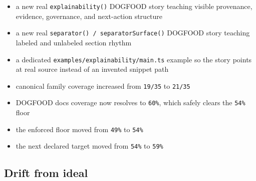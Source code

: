 \begin{itemize}
\tightlist
\item
  a new real \texttt{e\allowbreak{}x\allowbreak{}p\allowbreak{}l\allowbreak{}a\allowbreak{}i\allowbreak{}n\allowbreak{}a\allowbreak{}b\allowbreak{}i\allowbreak{}l\allowbreak{}i\allowbreak{}t\allowbreak{}y\allowbreak{}(\allowbreak{})} DOGFOOD story teaching visible provenance, evidence, governance, and next-action structure
\item
  a new real \texttt{s\allowbreak{}e\allowbreak{}p\allowbreak{}a\allowbreak{}r\allowbreak{}a\allowbreak{}t\allowbreak{}o\allowbreak{}r\allowbreak{}(\allowbreak{})\allowbreak{} \allowbreak{}/\allowbreak{} \allowbreak{}s\allowbreak{}e\allowbreak{}p\allowbreak{}a\allowbreak{}r\allowbreak{}a\allowbreak{}t\allowbreak{}o\allowbreak{}r\allowbreak{}S\allowbreak{}u\allowbreak{}r\allowbreak{}f\allowbreak{}a\allowbreak{}c\allowbreak{}e\allowbreak{}(\allowbreak{})} DOGFOOD story teaching labeled and unlabeled section rhythm
\item
  a dedicated \texttt{e\allowbreak{}x\allowbreak{}a\allowbreak{}m\allowbreak{}p\allowbreak{}l\allowbreak{}e\allowbreak{}s\allowbreak{}/\allowbreak{}e\allowbreak{}x\allowbreak{}p\allowbreak{}l\allowbreak{}a\allowbreak{}i\allowbreak{}n\allowbreak{}a\allowbreak{}b\allowbreak{}i\allowbreak{}l\allowbreak{}i\allowbreak{}t\allowbreak{}y\allowbreak{}/\allowbreak{}m\allowbreak{}a\allowbreak{}i\allowbreak{}n\allowbreak{}.\allowbreak{}t\allowbreak{}s} example so the story points at real source instead of an invented snippet path
\item
  canonical family coverage increased from \texttt{1\allowbreak{}9\allowbreak{}/\allowbreak{}3\allowbreak{}5} to \texttt{2\allowbreak{}1\allowbreak{}/\allowbreak{}3\allowbreak{}5}
\item
  DOGFOOD docs coverage now resolves to \texttt{6\allowbreak{}0\allowbreak{}\%}, which safely clears the \texttt{5\allowbreak{}4\allowbreak{}\%} floor
\item
  the enforced floor moved from \texttt{4\allowbreak{}9\allowbreak{}\%} to \texttt{5\allowbreak{}4\allowbreak{}\%}
\item
  the next declared target moved from \texttt{5\allowbreak{}4\allowbreak{}\%} to \texttt{5\allowbreak{}9\allowbreak{}\%}
\end{itemize}

\subsection{Drift from ideal}\label{record-074-drift-from-ideal}

